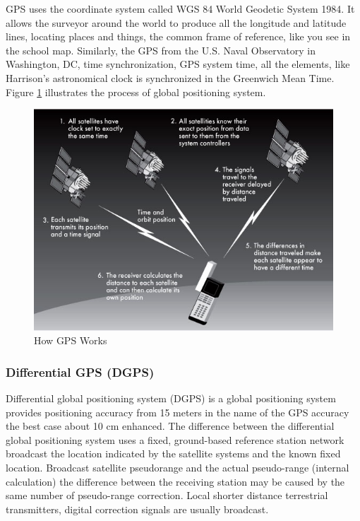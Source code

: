 \documentclass[12pt,a4paper,titlepage]{article}
\begin{document}
GPS uses the coordinate system called WGS 84 World Geodetic System 1984. It allows the surveyor around the world to produce all the longitude and latitude lines, locating places and things, the common frame of reference, like you see in the school map. Similarly, the GPS from the U.S. Naval Observatory in Washington, DC, time synchronization, GPS system time, all the elements, like Harrison's astronomical clock is synchronized in the Greenwich Mean Time. Figure \ref{fig:howgpsworks} illustrates the process of global positioning system.

\begin{figure}
\centering
\includegraphics[width=\textwidth]{fig/5steps-illustration}
\caption{How GPS Works}
\label{fig:howgpsworks}
\end{figure}


\subsubsection{Differential GPS (DGPS)} %
\label{ssub:differential_gps_dgps_}
Differential global positioning system (DGPS) is a global positioning system provides positioning accuracy from 15 meters in the name of the GPS accuracy the best case about 10 cm enhanced. The difference between the differential global positioning system uses a fixed, ground-based reference station network broadcast the location indicated by the satellite systems and the known fixed location. Broadcast satellite pseudorange and the actual pseudo-range (internal calculation) the difference between the receiving station may be caused by the same number of pseudo-range correction. Local shorter distance terrestrial transmitters, digital correction signals are usually broadcast. \cite{wiki-dgps}
\end{document}
